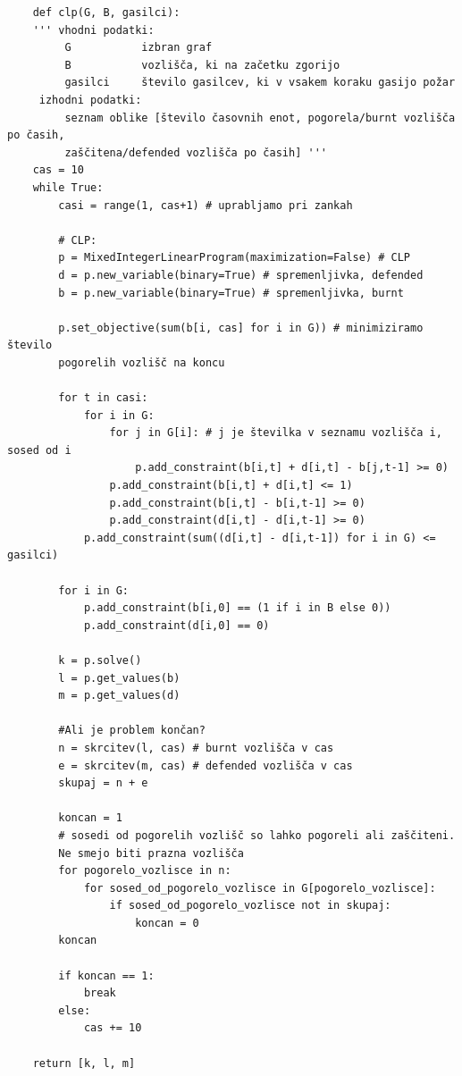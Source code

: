 \documentclass[a4paper, 12pt]{article}
\begin{document}
\begin{scriptsize}
\begin{verbatim}
    def clp(G, B, gasilci):
    ''' vhodni podatki:
         G           izbran graf
         B           vozlišča, ki na začetku zgorijo
         gasilci     število gasilcev, ki v vsakem koraku gasijo požar
     izhodni podatki:
         seznam oblike [število časovnih enot, pogorela/burnt vozlišča po časih, 
         zaščitena/defended vozlišča po časih] '''
    cas = 10
    while True:
        casi = range(1, cas+1) # uprabljamo pri zankah
    
        # CLP:
        p = MixedIntegerLinearProgram(maximization=False) # CLP
        d = p.new_variable(binary=True) # spremenljivka, defended
        b = p.new_variable(binary=True) # spremenljivka, burnt

        p.set_objective(sum(b[i, cas] for i in G)) # minimiziramo število 
        pogorelih vozlišč na koncu 

        for t in casi:
            for i in G:
                for j in G[i]: # j je številka v seznamu vozlišča i, sosed od i
                    p.add_constraint(b[i,t] + d[i,t] - b[j,t-1] >= 0)
                p.add_constraint(b[i,t] + d[i,t] <= 1)
                p.add_constraint(b[i,t] - b[i,t-1] >= 0)
                p.add_constraint(d[i,t] - d[i,t-1] >= 0)
            p.add_constraint(sum((d[i,t] - d[i,t-1]) for i in G) <= gasilci)

        for i in G:
            p.add_constraint(b[i,0] == (1 if i in B else 0))
            p.add_constraint(d[i,0] == 0)
            
        k = p.solve()
        l = p.get_values(b)
        m = p.get_values(d)
        
        #Ali je problem končan?
        n = skrcitev(l, cas) # burnt vozlišča v cas
        e = skrcitev(m, cas) # defended vozlišča v cas
        skupaj = n + e
        
        koncan = 1
        # sosedi od pogorelih vozlišč so lahko pogoreli ali zaščiteni.
        Ne smejo biti prazna vozlišča
        for pogorelo_vozlisce in n:
            for sosed_od_pogorelo_vozlisce in G[pogorelo_vozlisce]:
                if sosed_od_pogorelo_vozlisce not in skupaj:
                    koncan = 0
        koncan
        
        if koncan == 1:
            break
        else:
            cas += 10
        
    return [k, l, m]
\end{verbatim}
\end{scriptsize}
\end{document}
